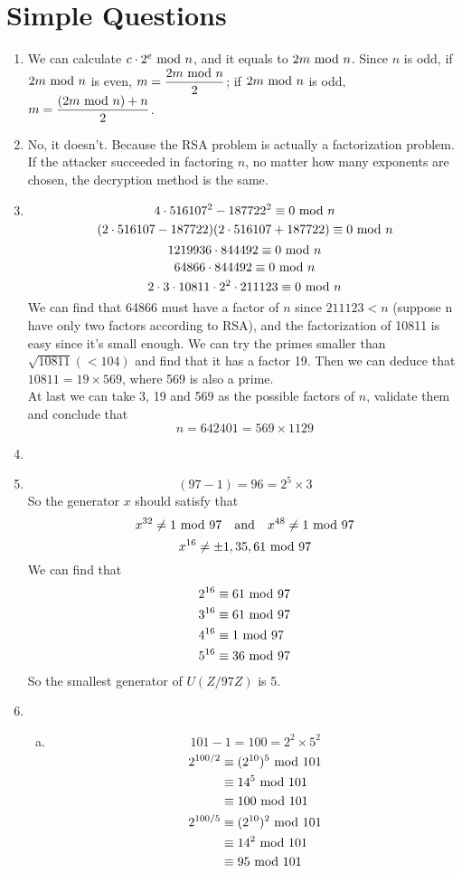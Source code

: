 \documentclass{article}
\renewcommand{\mod}{{\rm\ mod\ }}
\begin{document}
\section{Simple Questions}
\begin{enumerate}
\item
We can calculate $c\cdot 2^e\mod n$, and it equals to $2m\mod n$. Since $n$ is odd, if $2m\mod n$ is even, $m=\dfrac{2m\mod n}{2}$; if $2m\mod n$ is odd, $m=\dfrac{(2m\mod n)+n}{2}$.

\item
No, it doesn't. Because the RSA problem is actually a factorization problem. If the attacker succeeded in factoring $n$, no matter how many exponents are chosen, the decryption method is the same.

\item
$$4\cdot516107^2-187722^2\equiv0\mod n$$
$$(2\cdot516107-187722)(2\cdot516107+187722)\equiv0\mod n$$
$$1219936\cdot844492\equiv0\mod n$$
$$64866\cdot844492\equiv0\mod n$$
$$2\cdot3\cdot10811\cdot2^2\cdot211123\equiv0\mod n$$
We can find that 64866 must have a factor of $n$ since $211123<n$ (suppose n have only two factors according to RSA), and the factorization of 10811 is easy since it's small enough. We can try the primes smaller than $\sqrt{10811}(<104)$ and find that it has a factor 19. Then we can deduce that $10811=19\times569$, where 569 is also a prime.\\

At last we can take 3, 19 and 569 as the possible factors of $n$,  validate them and conclude that
$$n=642401=569\times1129$$
\item


\item
$$(97-1)=96=2^5\times3$$
So the generator $x$ should satisfy that 
$$x^{32}\neq 1\mod 97\quad{\rm and}\quad x^{48}\neq 1\mod 97$$
$$x^{16}\neq \pm 1,35,61\mod 97$$
We can find that
\begin{align*}
2^{16}&\equiv61\mod97\\
3^{16}&\equiv61\mod97\\
4^{16}&\equiv1\mod97\\
5^{16}&\equiv36\mod97
\end{align*}
So the smallest generator of $U(Z/97Z)$ is 5.

\item
\begin{enumerate}[(a)]
\item
$$101-1=100=2^2\times5^2$$
\begin{align*}
2^{100/2}&\equiv(2^{10})^5\mod 101\\
&\equiv14^5\mod 101\\
&\equiv100\mod 101\\
2^{100/5}&\equiv(2^{10})^2\mod 101\\
&\equiv14^2\mod 101\\
&\equiv95\mod 101
\end{align*}


\end{enumerate}
\end{enumerate}
\end{document}
